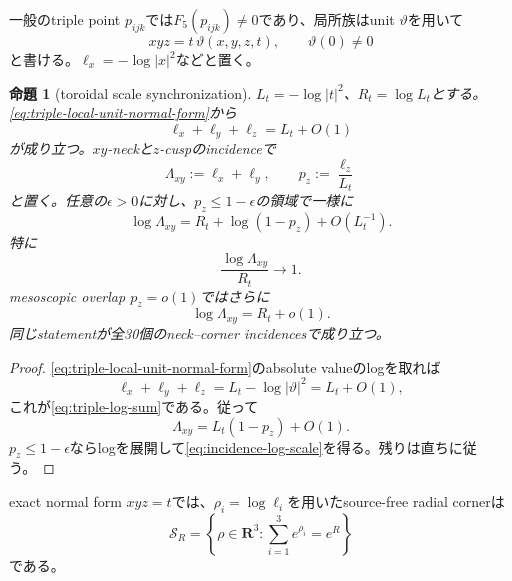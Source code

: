 \documentclass[11pt,a4paper]{ltjsarticle}
\newtheorem{proposition}[theorem]{命題}
\theoremstyle{definition}
\theoremstyle{remark}
\newcommand{\RR}{\mathbf R}
\begin{document}
一般のtriple point $p_{ijk}$では$F_5(p_{ijk})\ne0$であり、局所族はunit $\vartheta$を用いて
\begin{equation}\label{eq:triple-local-unit-normal-form}
 xyz=t\,\vartheta(x,y,z,t),
 \qquad \vartheta(0)\ne0
\end{equation}
と書ける。$\ell_x=-\log|x|^2$などと置く。

\begin{proposition}[toroidal scale synchronization]\label{prop:toroidal-scale-synchronization}
$L_t=-\log|t|^2$、$R_t=\log L_t$とする。\eqref{eq:triple-local-unit-normal-form}から
\begin{equation}\label{eq:triple-log-sum}
 \ell_x+\ell_y+\ell_z=L_t+O(1)
\end{equation}
が成り立つ。$xy$-neckと$z$-cuspのincidenceで
\[
 \Lambda_{xy}:=\ell_x+\ell_y,
 \qquad p_z:=\frac{\ell_z}{L_t}
\]
と置く。任意の$\epsilon>0$に対し、$p_z\le1-\epsilon$の領域で一様に
\begin{equation}\label{eq:incidence-log-scale}
 \log\Lambda_{xy}
 =R_t+\log(1-p_z)+O(L_t^{-1}).
\end{equation}
特に
\begin{equation}\label{eq:incidence-leading-residue}
 \frac{\log\Lambda_{xy}}{R_t}\longrightarrow1.
\end{equation}
mesoscopic overlap $p_z=o(1)$ではさらに
\begin{equation}\label{eq:mesoscopic-scale-sync}
 \log\Lambda_{xy}=R_t+o(1).
\end{equation}
同じstatementが全30個のneck--corner incidencesで成り立つ。
\end{proposition}

\begin{proof}
\eqref{eq:triple-local-unit-normal-form}のabsolute valueのlogを取れば
\[
 \ell_x+\ell_y+\ell_z
 =L_t-\log|\vartheta|^2
 =L_t+O(1),
\]
これが\eqref{eq:triple-log-sum}である。従って
\[
 \Lambda_{xy}=L_t(1-p_z)+O(1).
\]
$p_z\le1-\epsilon$ならlogを展開して\eqref{eq:incidence-log-scale}を得る。残りは直ちに従う。
\end{proof}

exact normal form $xyz=t$では、$\rho_i=\log\ell_i$を用いたsource-free radial cornerは
\begin{equation}\label{eq:softmax-corner-level}
 \mathscr S_R
 =\left\{\rho\in\RR^3:\sum_{i=1}^3e^{\rho_i}=e^R\right\}
\end{equation}
である。
\end{document}
